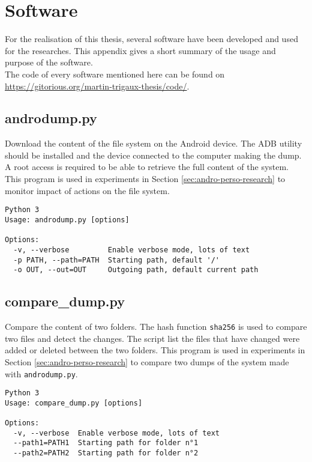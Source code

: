
\chapter{Software}
\label{chap:app-soft}

For the realisation of this thesis, several software have been developed and used for the researches.
This appendix gives a short summary of the usage and purpose of the software.\\

The code of every software mentioned here can be found on \url{https://gitorious.org/martin-trigaux-thesis/code/}.


\section{androdump.py}

Download the content of the file system on the Android device.
The ADB utility should be installed and the device connected to the computer making the dump.
A root access is required to be able to retrieve the full content of the system.
This program is used in experiments in Section \ref{sec:andro-perso-research} to monitor impact of actions on the file system.

\begin{verbatim}
Python 3
Usage: androdump.py [options]

Options:
  -v, --verbose         Enable verbose mode, lots of text
  -p PATH, --path=PATH  Starting path, default '/'
  -o OUT, --out=OUT     Outgoing path, default current path
\end{verbatim}

\section{compare\_dump.py}

Compare the content of two folders.
The hash function \texttt{sha256} is used to compare two files and detect the changes.
The script list the files that have changed were added or deleted between the two folders.
This program is used in experiments in Section \ref{sec:andro-perso-research} to compare two dumps of the system made with \texttt{androdump.py}.

\begin{verbatim}
Python 3
Usage: compare_dump.py [options]

Options:
  -v, --verbose  Enable verbose mode, lots of text
  --path1=PATH1  Starting path for folder n°1
  --path2=PATH2  Starting path for folder n°2
\end{verbatim}

